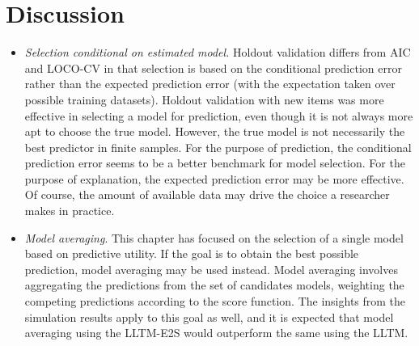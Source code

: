 %


\section{Discussion}

\begin{itemize}
	\item \emph{Selection conditional on estimated model.} Holdout validation differs from AIC and LOCO-CV in that selection is based on the conditional prediction error rather than the expected prediction error (with the expectation taken over possible training datasets). Holdout validation with new items was more effective in selecting a model for prediction, even though it is not always more apt to choose the true model. However, the true model is not necessarily the best predictor in finite samples. For the purpose of prediction, the conditional prediction error seems to be a better benchmark for model selection. For the purpose of explanation, the expected prediction error may be more effective. Of course, the amount of available data may drive the choice a researcher makes in practice.
	\item \emph{Model averaging}. This chapter has focused on the selection of a single model based on predictive utility. If the goal is to obtain the best possible prediction, model averaging may be used instead. Model averaging involves aggregating the predictions from the set of candidates models, weighting the competing predictions according to the score function. The insights from the simulation results apply to this goal as well, and it is expected that model averaging using the LLTM-E2S would outperform the same using the LLTM.
\end{itemize}



